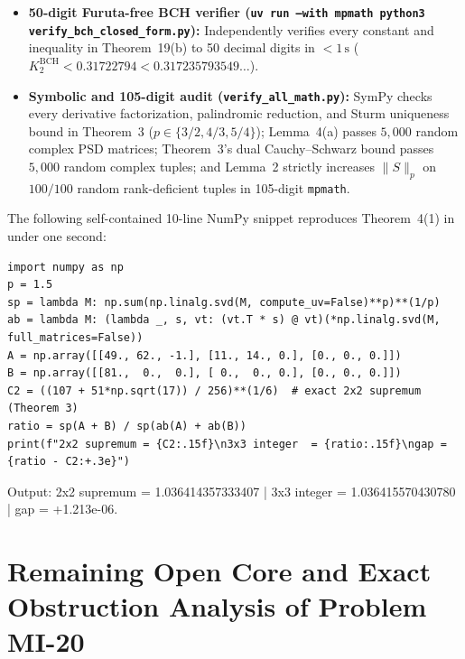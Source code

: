 \documentclass[10pt,letterpaper]{article}
\begin{document}
\begin{itemize}[leftmargin=1.5em,itemsep=2pt]
  \item \textbf{50-digit Furuta-free BCH verifier (\texttt{uv run --with mpmath python3 verify\_bch\_closed\_form.py}):} Independently verifies every constant and inequality in Theorem~19(b) to 50 decimal digits in $< 1\,\mathrm{s}$ ($K_2^{\mathrm{BCH}} < 0.31722794 < 0.317235793549\dots$).
  \item \textbf{Symbolic and 105-digit audit (\texttt{verify\_all\_math.py}):} SymPy checks every derivative factorization, palindromic reduction, and Sturm uniqueness bound in Theorem~3 ($p \in \{3/2, 4/3, 5/4\}$); Lemma~4(a) passes $5{,}000$ random complex PSD matrices; Theorem~3's dual Cauchy--Schwarz bound passes $5{,}000$ random complex tuples; and Lemma~2 strictly increases $\|S\|_p$ on $100/100$ random rank-deficient tuples in 105-digit \texttt{mpmath}.
\end{itemize}

The following self-contained 10-line NumPy snippet reproduces Theorem~4(1) in under one second:
\begin{tcolorbox}[codebox]
\begin{lstlisting}
import numpy as np
p = 1.5
sp = lambda M: np.sum(np.linalg.svd(M, compute_uv=False)**p)**(1/p)
ab = lambda M: (lambda _, s, vt: (vt.T * s) @ vt)(*np.linalg.svd(M, full_matrices=False))
A = np.array([[49., 62., -1.], [11., 14., 0.], [0., 0., 0.]])
B = np.array([[81.,  0.,  0.], [ 0.,  0., 0.], [0., 0., 0.]])
C2 = ((107 + 51*np.sqrt(17)) / 256)**(1/6)  # exact 2x2 supremum (Theorem 3)
ratio = sp(A + B) / sp(ab(A) + ab(B))
print(f"2x2 supremum = {C2:.15f}\n3x3 integer  = {ratio:.15f}\ngap = {ratio - C2:+.3e}")
\end{lstlisting}
\end{tcolorbox}
\vspace{-2pt}
{\ttfamily\footnotesize\color{ink} Output: 2x2 supremum = 1.036414357333407 \;|\; 3x3 integer = 1.036415570430780 \;|\; gap = +1.213e-06.}

\section{Remaining Open Core and Exact Obstruction Analysis of Problem MI-20}\label{sec:open_core}
\end{document}
